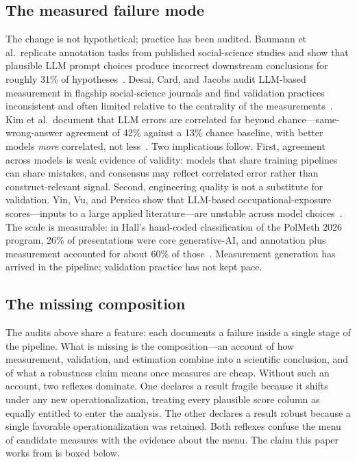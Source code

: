 \documentclass[10pt,letterpaper]{article}
\begin{document}
\subsection{The measured failure mode}
The change is not hypothetical; practice has been audited.
Baumann et al.~replicate annotation tasks from published social-science studies and show that plausible LLM prompt choices produce incorrect downstream conclusions for roughly 31\% of hypotheses~\cite{bauman2026}.
Desai, Card, and Jacobs audit LLM-based measurement in flagship social-science journals and find validation practices inconsistent and often limited relative to the centrality of the measurements~\cite{desai2026}.
Kim et al.~document that LLM errors are correlated far beyond chance---same-wrong-answer agreement of 42\% against a 13\% chance baseline, with better models \emph{more} correlated, not less~\cite{kim2025}.
Two implications follow.
First, agreement across models is weak evidence of validity: models that share training pipelines can share mistakes, and consensus may reflect correlated error rather than construct-relevant signal.
Second, engineering quality is not a substitute for validation.
Yin, Vu, and Persico show that LLM-based occupational-exposure scores---inputs to a large applied literature---are unstable across model choices~\cite{yinvu2026}.
The scale is measurable: in Hall's hand-coded classification of the PolMeth 2026 program, 26\% of presentations were core generative-AI, and annotation plus measurement accounted for about 60\% of those~\cite{hall2026}.
Measurement generation has arrived in the pipeline; validation practice has not kept pace.

\subsection{The missing composition}
The audits above share a feature: each documents a failure inside a single stage of the pipeline.
What is missing is the composition---an account of how measurement, validation, and estimation combine into a scientific conclusion, and of what a robustness claim means once measures are cheap.
Without such an account, two reflexes dominate.
One declares a result fragile because it shifts under any new operationalization, treating every plausible score column as equally entitled to enter the analysis.
The other declares a result robust because a single favorable operationalization was retained.
Both reflexes confuse the menu of candidate measures with the evidence about the menu.
The claim this paper works from is boxed below.
\end{document}
